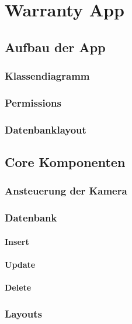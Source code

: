 \chapter{Warranty App}
\label{sec:WarrantyApp}






\section{Aufbau der App}

\subsection{Klassendiagramm}

\subsection{Permissions}

\subsection{Datenbanklayout}

\section{Core Komponenten}


\subsection{Ansteuerung der Kamera}


\subsection{Datenbank}



\subsubsection{Insert}


\subsubsection{Update}



\subsubsection{Delete}



\subsection{Layouts}